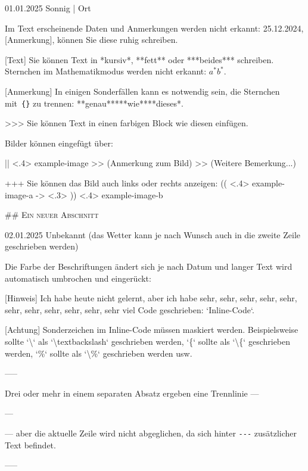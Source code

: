 \documentclass[11pt, paperstyle=light yellow, color entry, day-month-year,
  title in boldface, title in sffamily, use style = classical]{jwjournal}
\begin{document}
01.01.2025 Sonnig | Ort

  Im Text erscheinende Daten und Anmerkungen werden nicht erkannt: 25.12.2024, [Anmerkung], können Sie diese ruhig schreiben.

  [Text]
    Sie können Text in *kursiv*, **fett** oder ***beides*** schreiben.
    \\
    Sternchen im Mathematikmodus werden nicht erkannt: $a^* b^*$.

  [Anmerkung] In einigen Sonderfällen kann es notwendig sein, die Sternchen mit~\texttt{\{\}} zu trennen: **genau**{}***wie***{}*dieses*.

  >>> Sie können Text in einen farbigen Block wie diesen einfügen.

  Bilder können eingefügt über:

  || <.4> {example-image} %
  >> (Anmerkung zum Bild)
  >> (Weitere Bemerkung...)

  +++
  Sie können das Bild auch links oder rechts anzeigen:
  (( <.4> {example-image-a} %
  -> <.3> %
  )) <.4> {example-image-b} %


## {\textsc{Ein neuer Abschnitt}}

02.01.2025
Unbekannt (das Wetter kann je nach Wunsch auch in die zweite Zeile geschrieben werden)

  Die Farbe der Beschriftungen ändert sich je nach Datum und langer Text wird automatisch umbrochen und eingerückt:

  [Hinweis] Ich habe heute nicht gelernt, aber ich habe sehr, sehr, sehr, sehr, sehr, sehr, sehr, sehr, sehr, sehr, sehr viel Code geschrieben: `Inline-Code`.

  [Achtung] Sonderzeichen im Inline-Code müssen maskiert werden. Beispielsweise sollte `\textbackslash` als `\textbackslash textbackslash` geschrieben werden, `\{` sollte als `\textbackslash\{` geschrieben werden, `\%` sollte als `\textbackslash\%` geschrieben werden usw.

  -----

  Drei oder mehr \textquote{\texttt{-}} in einem separaten Absatz ergeben eine Trennlinie ---

  ---

  --- aber die aktuelle Zeile wird nicht abgeglichen, da sich hinter \texttt{-}\texttt{-}\texttt{-} zusätzlicher Text befindet.

  -----
\end{document}
